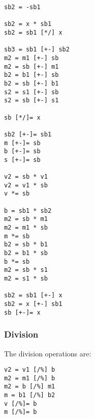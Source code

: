 \documentclass[twoside,letterpaper,11pt]{article}
\begin{document}
\begin{verbatim}
sb2 = -sb1

sb2 = x * sb1
sb2 = sb1 [*/] x

sb3 = sb1 [+-] sb2
m2 = m1 [+-] sb
m2 = sb [+-] m1
b2 = b1 [+-] sb
b2 = sb [+-] b1
s2 = s1 [+-] sb
s2 = sb [+-] s1

sb [*/]= x

sb2 [+-]= sb1
m [+-]= sb
b [+-]= sb
s [+-]= sb

v2 = sb * v1
v2 = v1 * sb
v *= sb

b = sb1 * sb2
m2 = sb * m1
m2 = m1 * sb
m *= sb
b2 = sb * b1
b2 = b1 * sb
b *= sb
m2 = sb * s1
m2 = s1 * sb

sb2 = sb1 [+-] x
sb2 = x [+-] sb1
sb [+-]= x
\end{verbatim}

\subsubsection{Division}

The division operations are:
\begin{verbatim}
v2 = v1 [/%] b
m2 = m1 [/%] b
m2 = b [/%] m1
m = b1 [/%] b2
v [/%]= b
m [/%]= b
\end{verbatim}
\end{document}

